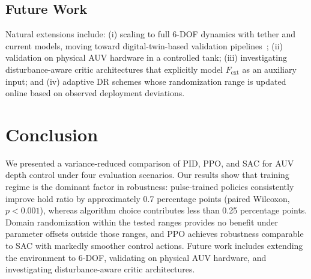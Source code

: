 \documentclass[conference]{IEEEtran}
\begin{document}
\subsection{Future Work}
Natural extensions include: (i) scaling to full 6-DOF dynamics with tether and current models, moving toward digital-twin-based validation pipelines~\cite{lin2025docking}; (ii) validation on physical AUV hardware in a controlled tank; (iii) investigating disturbance-aware critic architectures that explicitly model $F_{\text{ext}}$ as an auxiliary input; and (iv) adaptive DR schemes whose randomization range is updated online based on observed deployment deviations.

\section{Conclusion}
We presented a variance-reduced comparison of PID, PPO, and SAC for AUV depth control under four evaluation scenarios. Our results show that training regime is the dominant factor in robustness: pulse-trained policies consistently improve hold ratio by approximately 0.7 percentage points (paired Wilcoxon, $p<0.001$), whereas algorithm choice contributes less than 0.25 percentage points. Domain randomization within the tested ranges provides no benefit under parameter offsets outside those ranges, and PPO achieves robustness comparable to SAC with markedly smoother control actions. Future work includes extending the environment to 6-DOF, validating on physical AUV hardware, and investigating disturbance-aware critic architectures.



\end{document}
